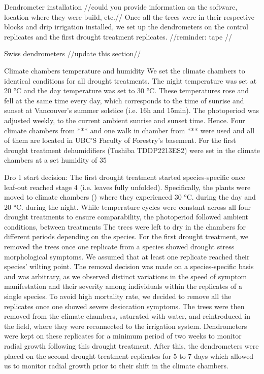 \documentclass{article}
\begin{document}
	Dendrometer installation //could you provide information on the software, location where they were build, etc.// 
	Once all the trees were in their respective blocks and drip irrigation installed, we set up the dendrometers on the control replicates and the first drought treatment replicates. 
	//reminder: tape //
	
	Swiss dendrometers
	//update this section//
	
	Climate chambers temperature and humidity
	We set the climate chambers to identical conditions for all drought treatments. The night temperature was set at 20 °C and the day temperature was set to 30 °C. These temperatures rose and fell at the same time every day, which corresponds to the time of sunrise and sunset at Vancouver’s summer solstice (i.e. 16h and 15min). The photoperiod was adjusted weekly, to the current ambient sunrise and sunset time. Hence. Four climate chambers from *** and one walk in chamber from *** were used and all of them are located in UBC’S Faculty of Forestry’s basement. For the first drought treatment dehumidifiers (Toshiba TDDP2213ES2) were set in the climate chambers at a set humidity of 35%
	
	Dro 1 start decision:
	The first drought treatment started species-specific once leaf-out reached stage 4 (i.e. leaves fully unfolded). Specifically, the plants were moved to climate chambers () where they experienced 30 °C. during the day and 20 °C. during the night. While temperature cycles were constant across all four drought treatments to ensure comparability, the photoperiod followed ambient conditions, between treatments The trees were left to dry in the chambers for different periods depending on the species. For the first drought treatment, we removed the trees once one replicate from a species showed drought stress morphological symptoms. We assumed that at least one replicate reached their species’ wilting point. The removal decision was made on a species-specific basis and was arbitrary, as we observed distinct variations in the speed of symptom manifestation and their severity among individuals within the replicates of a single species. To avoid high mortality rate, we decided to remove all the replicates once one showed severe desiccation symptoms. The trees were then removed from the climate chambers, saturated with water, and reintroduced in the field, where they were reconnected to the irrigation system. Dendrometers were kept on these replicates for a minimum period of two weeks to monitor radial growth following this drought treatment. After this, the dendrometers were placed on the second drought treatment replicates for 5 to 7 days which allowed us to monitor radial growth prior to their shift in the climate chambers.
	
\end{document}
